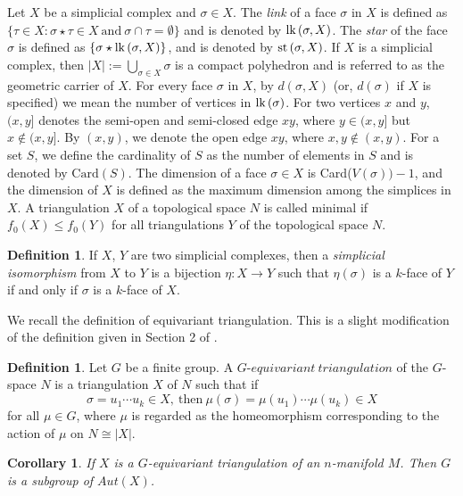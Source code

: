 \documentclass[11pt]{amsart}
\numberwithin{equation}{section}
\newtheorem{corollary}[theorem]{Corollary}
\theoremstyle{definition}
\newtheorem{defn}[theorem]{Definition}
\newcommand{\st}{\mbox{\upshape st}\,}
\newcommand{\lk}{\mbox{\upshape lk}\,}
\begin{document}
Let $X$ be a simplicial complex and $\sigma \in X$. The {\em link} of a face $\sigma$ in $X$ is defined as 
 $\{\tau \in X : \sigma \star \tau \in X ~\mbox{and}~ \sigma \cap \tau = \emptyset\}$ and is denoted by $\lk(\sigma,X)$. The {\em star} of the face $\sigma$ is defined as $\{\sigma \star \lk(\sigma,X)\}$, and is denoted by $\st(\sigma, X)$.  If $X$ is a simplicial complex, then $|X|:= \bigcup_{\sigma \in X} \sigma$ is a compact polyhedron and is referred to as the geometric carrier of $X$. For every face $\sigma$ in $X$, by $d(\sigma,X)$ (or, $d(\sigma)$ if $X$ is specified) we mean the number of vertices in $\lk (\sigma)$. For two vertices $x$ and $y$, $(x,y]$ denotes the semi-open and semi-closed edge $xy$, where $y\in (x,y]$ but $x \not \in (x,y]$. By $(x,y)$, we denote the open edge $xy$, where $x, y\not \in (x,y)$. 
 For a set $S$, we define the cardinality of $S$ as the number of elements in $S$ and is denoted by $\mathrm{Card}(S)$. The dimension of a face $\sigma\in X$ is Card($V(\sigma))-1$, and the dimension of $X$ is defined as the maximum dimension among the simplices in $X$. A triangulation  $X$ of a topological space $N$ is called minimal if $f_0(X) \leq f_0(Y)$ for all triangulations $Y$ of the topological space $N$.

\begin{defn}
{\rm If $X$, $Y$ are two simplicial complexes, then a {\em simplicial isomorphism} from $X$ to $Y$ is a bijection $\eta : X \to Y$ such that $\eta(\sigma)$ is a $k$-face of $Y$ if and only if $ \sigma$ is a $k$-face of $X$.} 
\end{defn}




We recall the definition of equivariant triangulation. This is a slight modification of the definition given in Section 2 of \cite{Il}.
\begin{defn}
{\rm Let $G$ be a finite group. A $G$-$equivariant~ triangulation$ of the $G$-space $N$ is a triangulation $X$ of $N$ such
that if $$\sigma =u_1\cdots u_k \in X, ~\mbox{then} ~ \mu(\sigma)=\mu(u_1)\cdots \mu(u_k) \in X$$ for all $ \mu\in G$, where $\mu$ is regarded as the
homeomorphism corresponding to the action of $\mu$ on $N\cong|X|$.}
\end{defn}

\begin{corollary}\label{subgroup}
If $X$ is a $G$-equivariant triangulation of an $n$-manifold $M$. Then $G$ is a subgroup of $Aut(X)$.
\end{corollary}
\end{document}
